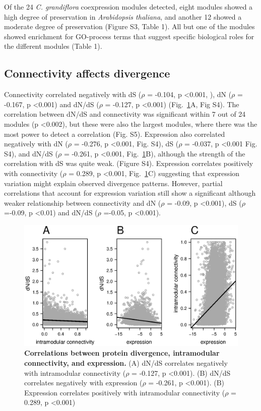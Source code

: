 Of the 24 \textit{C. grandiflora} coexpression modules detected, eight modules showed a high degree of preservation in \textit{Arabidopsis thaliana}, and another 12 showed a moderate degree of preservation (Figure S3, Table 1). All but one of the modules showed enrichment for GO-process terms that suggest specific biological roles for the different modules (Table 1).

\subsection{Connectivity affects divergence}
Connectivity correlated negatively with dS ($\rho$ = -0.104, p \textless 0.001, ), dN ($\rho$ = -0.167, p \textless 0.001) and dN/dS ($\rho$ = -0.127, p \textless 0.001) (Fig.~\ref{fig:f1}A, Fig S4). The correlation between dN/dS and connectivity was significant within 7 out of 24 modules (p \textless 0.002), but these were also the largest modules, where there was the most power to detect a correlation (Fig. S5). Expression also correlated negatively with dN ($\rho$ = -0.276, p \textless 0.001, Fig. S4), dS ($\rho$ = -0.037, p \textless 0.001 Fig. S4), and dN/dS ($\rho$ = -0.261, p \textless 0.001, Fig.~\ref{fig:f1}B),  although the strength of the correlation with dS was quite weak. (Figure S4). Expression correlates positively with connectivity ($\rho$ = 0.289, p \textless 0.001, Fig.~\ref{fig:f1}C) suggesting that expression variation might explain observed divergence patterns. However, partial correlations that account for expression variation still show a significant although weaker relationship between connectivity and dN ($\rho$ = -0.09, p \textless 0.001), dS ($\rho$ =-0.09, p \textless 0.01) and dN/dS ($\rho$ =-0.05, p \textless 0.001). 

\begin{figure}[ht!]
\centering
\includegraphics[width=\linewidth]{Ch4Fig1}
\caption{\textbf{Correlations between protein divergence, intramodular connectivity, and expression.} (A) dN/dS correlates negatively with intramodular connectivity ($\rho$ = -0.127, p \textless 0.001). (B) dN/dS correlates negatively with expression ($\rho$ = -0.261, p \textless 0.001). (B) Expression correlates positively with intramodular connectivity ($\rho$ = 0.289, p \textless 0.001)}
\label{fig:f1}
\end{figure}

